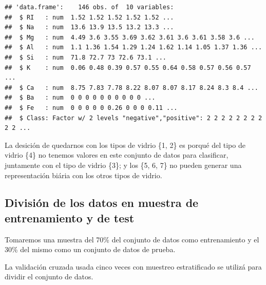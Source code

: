 \documentclass[]{article}
\newenvironment{Shaded}{\begin{snugshade}}{\end{snugshade}}
\newcommand{\DataTypeTok}[1]{\textcolor[rgb]{0.13,0.29,0.53}{#1}}
\newcommand{\DecValTok}[1]{\textcolor[rgb]{0.00,0.00,0.81}{#1}}
\newcommand{\FloatTok}[1]{\textcolor[rgb]{0.00,0.00,0.81}{#1}}
\newcommand{\KeywordTok}[1]{\textcolor[rgb]{0.13,0.29,0.53}{\textbf{#1}}}
\newcommand{\NormalTok}[1]{#1}
\newcommand{\OperatorTok}[1]{\textcolor[rgb]{0.81,0.36,0.00}{\textbf{#1}}}
\newcommand{\OtherTok}[1]{\textcolor[rgb]{0.56,0.35,0.01}{#1}}
\newcommand{\StringTok}[1]{\textcolor[rgb]{0.31,0.60,0.02}{#1}}
\begin{document}
\begin{verbatim}
## 'data.frame':    146 obs. of  10 variables:
##  $ RI   : num  1.52 1.52 1.52 1.52 1.52 ...
##  $ Na   : num  13.6 13.9 13.5 13.2 13.3 ...
##  $ Mg   : num  4.49 3.6 3.55 3.69 3.62 3.61 3.6 3.61 3.58 3.6 ...
##  $ Al   : num  1.1 1.36 1.54 1.29 1.24 1.62 1.14 1.05 1.37 1.36 ...
##  $ Si   : num  71.8 72.7 73 72.6 73.1 ...
##  $ K    : num  0.06 0.48 0.39 0.57 0.55 0.64 0.58 0.57 0.56 0.57 ...
##  $ Ca   : num  8.75 7.83 7.78 8.22 8.07 8.07 8.17 8.24 8.3 8.4 ...
##  $ Ba   : num  0 0 0 0 0 0 0 0 0 0 ...
##  $ Fe   : num  0 0 0 0 0 0.26 0 0 0 0.11 ...
##  $ Class: Factor w/ 2 levels "negative","positive": 2 2 2 2 2 2 2 2 2 2 ...
\end{verbatim}

La desición de quedarnos con los tipos de vidrio \{1, 2\} es porqué del
tipo de vidrio \{4\} no tenemos valores en este conjunto de datos para
clasificar, juntamente con el tipo de vidrio \{3\}; y los \{5, 6, 7\} no
pueden generar una representación biária con los otros tipos de vidrio.

\hypertarget{divisiuxf3n-de-los-datos-en-muestra-de-entrenamiento-y-de-test}{%
\subsection{División de los datos en muestra de entrenamiento y de
test}\label{divisiuxf3n-de-los-datos-en-muestra-de-entrenamiento-y-de-test}}

Tomaremos una muestra del 70\% del conjunto de datos como entrenamiento
y el 30\% del mismo como un conjunto de datos de prueba.

La validación cruzada usada cinco veces con muestreo estratificado se
utilizá para dividir el conjunto de datos.

\begin{Shaded}
\end{Shaded}
\end{document}
